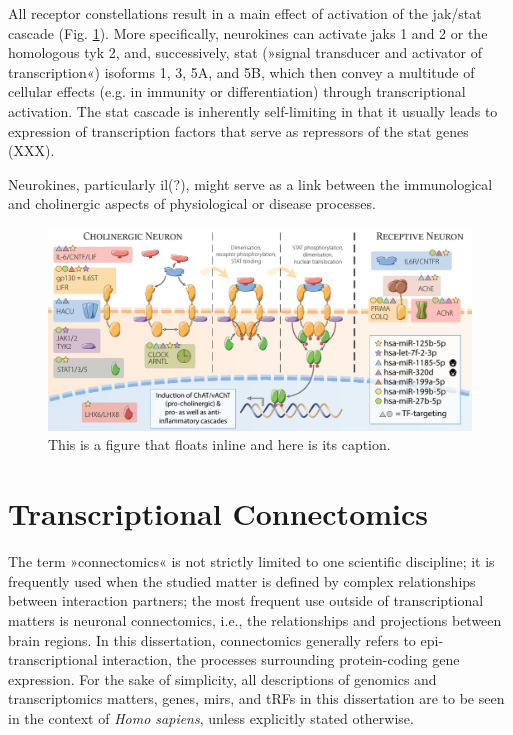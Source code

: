 All receptor constellations result in a main effect of activation of the \acs{jak}/\acs{stat} cascade (Fig. \ref{fig:neurokine}). More specifically, neurokines can activate \acfp{jak} 1 and 2 or the homologous \ac{tyk} 2, and, successively, \ac{stat} (»signal transducer and activator of transcription«) isoforms 1, 3, 5A, and 5B, which then convey a multitude of cellular effects (e.g. in immunity or differentiation) through transcriptional activation. The \ac{stat} cascade is inherently self-limiting in that it usually leads to expression of transcription factors that serve as repressors of the \ac{stat} genes (XXX)\cite{}. 

Neurokines, particularly \ac{il}(?), might serve as a link between the immunological and cholinergic aspects of physiological or disease processes.

\begin{figure}
\includegraphics[width=\textwidth]{figures/neurokine}
\caption[Short figure name.]{This is a figure that floats inline and here is its caption.
\label{fig:neurokine}}
\end{figure}




\section{Transcriptional Connectomics}
The term »connectomics« is not strictly limited to one scientific discipline; it is frequently used when the studied matter is defined by complex relationships between interaction partners; the most frequent use outside of transcriptional matters is neuronal connectomics, i.e., the relationships and projections between brain regions. In this dissertation, connectomics generally refers to epi-transcriptional interaction, the processes surrounding protein-coding gene expression. For the sake of simplicity, all descriptions of genomics and transcriptomics matters, genes, \acp{mir}, and tRFs in this dissertation are to be seen in the context of \textit{Homo sapiens}, unless explicitly stated otherwise.

